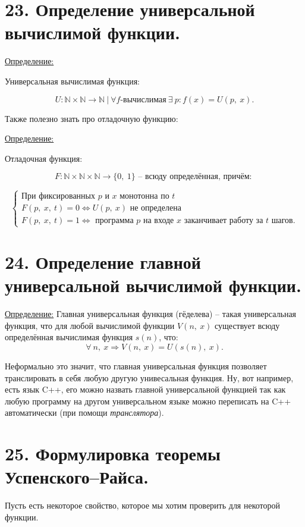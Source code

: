 \documentclass[a4paper, 12pt]{article}
\newcommand{\definition}{\underline{Определение:} }
\newcommand{\N}{\mathbb{N}}
\begin{document}
\section*{23. Определение универсальной вычислимой функции.}

\definition{Универсальная вычислимая функция:

    \[
        U : \N \times \N \to \N\ | \ \forall f\text{-вычислимая}\ \exists \ p: f(x) = U(p,\ x).
    \]

}

Также полезно знать про отладочную функцию:

\definition{Отладочная функция:

    \[
        F: \N\times\N\times\N \to \{0,\ 1\}\text{ -- всюду определённая, причём: }
    \]
    
    \[
        \begin{cases}
            \text{При фиксированных $p$ и $x$ монотонна по $t$}\\
            F(p,\ x,\ t) = 0 \Leftrightarrow U(p,\ x)\text{ не определена}\\
            F(p,\ x,\ t) = 1 \Leftrightarrow \text{ программа $p$ на входе $x$ заканчивает работу за $t$ шагов.}
        \end{cases}
    \]
}

\section*{24. Определение главной универсальной вычислимой функции.}

\definition{Главная универсальная функция (гёделева) -- такая универсальная функция, 
что для любой вычислимой функции $V(n,\ x)$ существует всюду определённая
вычислимая функция $s(n)$, что:
    \[
        \forall\ n,\ x \Rightarrow V(n,\ x) = U(s(n),\ x).
    \]
}

Неформально это значит, что главная универсальная функция позволяет транслировать
в себя любую другую унивесальная функция. Ну, вот например, есть язык C++, его можно
назвать главной универсальной функцией так как любую программу на другом универсальном
языке можно переписать на C++ автоматически (при помощи \emph{транслятора}).

\section*{25. Формулировка теоремы Успенского–Райса.}

Пусть есть некоторое свойство, которое мы хотим проверить
для некоторой функции. 
\end{document}
